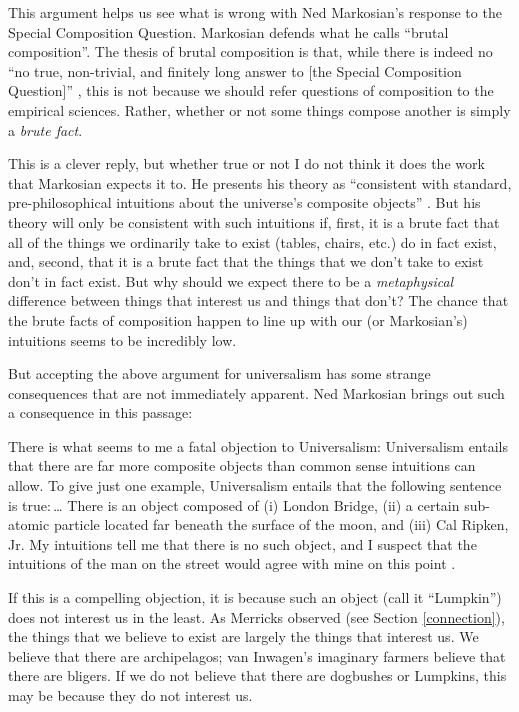 \documentclass[11pt]{article}
\newenvironment{squote}{%
\begin{spacing}{1}
       	\begin{list}{}{%
\setlength{\labelwidth}{0pt}%
\rightmargin\leftmargin%
}
\item\relax
}{%
\end{list}%
\end{spacing}
}
\begin{document}
\begin{spacing}{1.25}
This argument helps us see what is wrong with Ned Markosian's response
to the Special Composition Question.  Markosian defends what he calls
``brutal composition''.  The thesis of brutal composition is that,
while there is indeed no ``no true, non-trivial, and finitely long
answer to [the Special Composition Question]''
\citeyearpar[214]{markosian1998a}, this is not because we should refer
questions of composition to the empirical sciences.  Rather, whether
or not some things compose another is simply a {\em brute fact}.

This is a clever reply, but whether true or not I do not think it does
the work that Markosian expects it to.  He presents his theory as
``consistent with standard, pre-philosophical intuitions about the
universe's composite objects'' \citeyearpar[211]{markosian1998a}.  But
his theory will only be consistent with such intuitions if, first, it
is a brute fact that all of the things we ordinarily take to exist
(tables, chairs, etc.) do in fact exist, and, second, that it is a
brute fact that the things that we don't take to exist don't in fact
exist.  But why should we expect there to be a {\em metaphysical}
difference between things that interest us and things that don't?  The
chance that the brute facts of composition happen to line up with our
(or Markosian's) intuitions seems to be incredibly low.

But accepting the above argument for universalism has some strange
consequences that are not immediately apparent.  Ned Markosian brings
out such a consequence in this passage:

\begin{squote}
There is what seems to me a fatal objection to Universalism:
Universalism entails that there are far more composite objects than
common sense intuitions can allow.  To give just one example,
Universalism entails that the following sentence is true:\,\ldots
There is an object composed of (i) London Bridge, (ii) a certain
sub-atomic particle located far beneath the surface of the moon, and
(iii) Cal Ripken, Jr.  My intuitions tell me that there is no such
object, and I suspect that the intuitions of the man on the street
would agree with mine on this point \citeyearpar[228]{markosian1998a}.
\end{squote}

If this is a compelling objection, it is because such an object (call
it ``Lumpkin'') does not interest us in the least.  As Merricks
observed (see Section \ref{connection}), the things that we believe to
exist are largely the things that interest us.  We believe that there
are archipelagos; van Inwagen's imaginary farmers believe that there
are bligers.  If we do not believe that there are dogbushes or
Lumpkins, this may be because they do not interest us.


\end{spacing}
\end{document}
